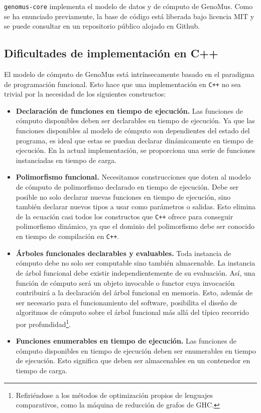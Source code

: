\verb|genomus-core| implementa el modelo de datos y de cómputo de GenoMus. Como se ha enunciado previamente, la base de código está liberada bajo licencia MIT y se puede consultar en un repositorio público alojado en Github\cite{genomus-core}.

\subsection{Dificultades de implementación en C++}\label{ssec:dificultades}

El modelo de cómputo de GenoMus está intrínsecamente basado en el paradigma de programación funcional. Esto hace que una implementación en \verb|C++| no sea trivial por la necesidad de los siguientes constructos:

\begin{itemize}
    \item \textbf{Declaración de funciones en tiempo de ejecución.} Las funciones de cómputo disponibles deben ser declarables en tiempo de ejecución. Ya que las funciones disponibles al modelo de cómputo son dependientes del estado del programa, es ideal que estas se puedan declarar dinámicamente en tiempo de ejecución. En la actual implementación, se proporciona una serie de funciones instanciadas en tiempo de carga.
    
    \item \textbf{Polimorfismo funcional.} Necesitamos construcciones que doten al modelo de cómputo de polimorfismo declarado en tiempo de ejecución. Debe ser posible no solo declarar nuevas funciones en tiempo de ejecución, sino también declarar nuevos tipos a usar como parámetros o salidas. Esto elimina de la ecuación casi todos los constructos que \verb|C++| ofrece para conseguir polimorfismo dinámico, ya que el dominio del polimorfismo debe ser conocido en tiempo de compilación en \verb|C++|.
    
    \item \textbf{Árboles funcionales declarables y evaluables.} Toda instancia de cómputo debe no solo ser computable sino también almacenable. La instancia de árbol funcional debe existir independientemente de su evaluación. Así, una función de cómputo será un objeto invocable o functor cuya invocación contribuirá a la declaración del árbol funcional en memoria. Esto, además de ser necesario para el funcionamiento del software, posibilita el diseño de algoritmos de cómputo sobre el árbol funcional más allá del típico recorrido por profundidad\footnote{
        Refiriéndose a los métodos de optimización propios de lenguajes comparativos, como la máquina de reducción de grafos de GHC\cite{haskell-wiki-STG}.
    }.
    
    \item \textbf{Funciones enumerables en tiempo de ejecución.} Las funciones de cómputo disponibles en tiempo de ejecución deben ser enumerables en tiempo de ejecución. Esto significa que deben ser almacenables en un contenedor en tiempo de carga.
\end{itemize}

